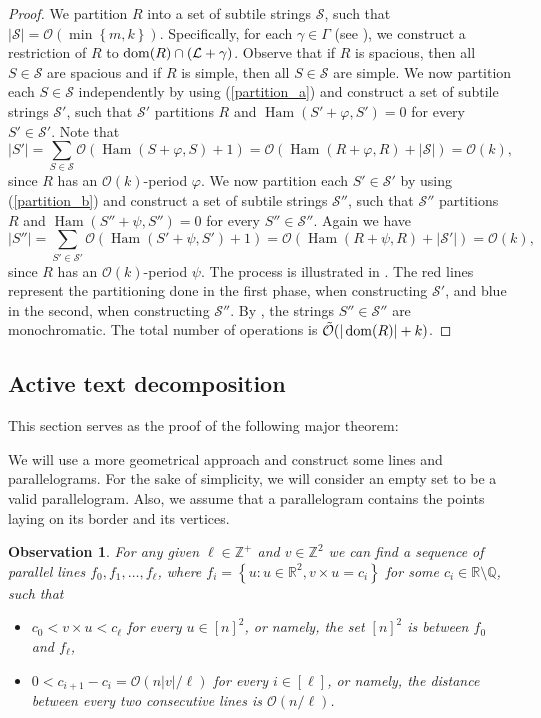 \documentclass[11pt, letterpaper]{article}
\theoremstyle{plain}
\newtheorem{observation}{Observation}
\theoremstyle{definition}
\theoremstyle{remark}
\newcommand{\R}{\mathbb{R}}
\newcommand{\Z}{\mathbb{Z}}
\renewcommand{\O}{\mathcal{O}}
\newcommand{\tO}{\tilde{\mathcal{O}}}
\renewcommand{\S}{\mathcal{S}}
\renewcommand{\L}{\mathcal{L}}
\renewcommand{\phi}{\varphi}
\newcommand{\set}[1]{\left\lbrace #1 \right\rbrace}
\DeclareMathOperator*{\Ham}{Ham}
\begin{document}
\tileDecomposition
\begin{proof}
	We partition $R$ into a set of subtile strings $\S$, such that $|\S| = \O(\min\set{m, k})$.
	Specifically, for each $\gamma \in \Gamma$ (see ), we construct a restriction of $R$ to $\d{R} \cap (\L + \gamma)$.
	Observe that if $R$ is spacious, then all $S \in \S$ are spacious and if $R$ is simple, then all $S \in \S$ are simple.
	We now partition each $S \in \S$ independently by using  (\ref{partition_a})
	and construct a set of subtile strings $\S'$, such that $\S'$ partitions $R$ and $\Ham(S' + \phi, S') = 0$ for every $S' \in \S'$.
	Note that
	\[ |S'| = \sum_{S \in \S} \O(\Ham(S + \phi, S) + 1) = \O(\Ham(R + \phi, R) + |\S|) = \O(k),\]
	since $R$ has an $\O(k)$-period $\phi$.
	We now partition each $S' \in \S'$ by using  (\ref{partition_b}) and construct a set of subtile strings $\S''$, such that $\S''$ partitions $R$ and $\Ham(S'' + \psi, S'') = 0$ for every $S'' \in \S''$.
	Again we have
	\[ |S''| = \sum_{S' \in \S'} \O(\Ham(S' + \psi, S') + 1) = \O(\Ham(R + \psi, R) + |\S'|) = \O(k),\]
	since $R$ has an $\O(k)$-period $\psi$.
	The process is illustrated in .
	The red lines represent the partitioning done in the first phase, when constructing $\S'$, and blue in the second, when constructing $\S''$.
	By , the strings $S'' \in \S''$ are monochromatic.
	The total number of operations is $\tO(|\d{R}| + k)$.
\end{proof}

\subsection{Active text decomposition} \label{text_decomposition_proof}

This section serves as the proof of the following major theorem:

\TextDecomposition

We will use a more geometrical approach and construct some lines and parallelograms.
For the sake of simplicity, we will consider an empty set to be a valid parallelogram.
Also, we assume that a parallelogram contains the points laying on its border and its vertices.



\newcommand{\IQ}{\mathbb{R} \setminus \mathbb{Q}}
\begin{observation}\label{line_existence}
	For any given $\ell \in \Z^+$ and $v \in \Z^2$ we can find a sequence of parallel lines $f_0, f_1, \dots, f_\ell$, where $f_i = \set{u : u \in \R^2, v \times u = c_i}$ for some $c_i \in \IQ$, such that
	\begin{itemize}
		\item $c_0 < v \times u < c_\ell$ for every $u \in [n]^2$, or namely, the set $[n]^2$ is between $f_0$ and $f_\ell$,
		\item $0 < c_{i + 1} - c_i = \O(n|v| / \ell)$ for every $i \in [\ell]$, or namely, the distance between every two consecutive lines is $\O(n / \ell)$.
	\end{itemize}
\end{observation}
\end{document}
